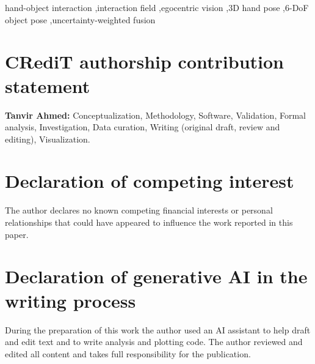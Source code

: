 \documentclass[final,5p,times,twocolumn]{elsarticle}
\begin{document}
\begin{frontmatter}
\title{\PaperTitle}
\author[a]{Tanvir Ahmed}




\begin{keyword}
hand-object interaction \sep interaction field \sep egocentric vision \sep 3D hand pose \sep 6-DoF object pose \sep uncertainty-weighted fusion
\end{keyword}
\end{frontmatter}














\section*{CRediT authorship contribution statement}
\textbf{Tanvir Ahmed:} Conceptualization, Methodology, Software, Validation, Formal analysis, Investigation, Data curation, Writing (original draft, review and editing), Visualization.

\section*{Declaration of competing interest}
The author declares no known competing financial interests or personal relationships that could have appeared to influence the work reported in this paper.

\section*{Declaration of generative AI in the writing process}
During the preparation of this work the author used an AI assistant to help draft and edit text and to write analysis and plotting code. The author reviewed and edited all content and takes full responsibility for the publication.
\end{document}

